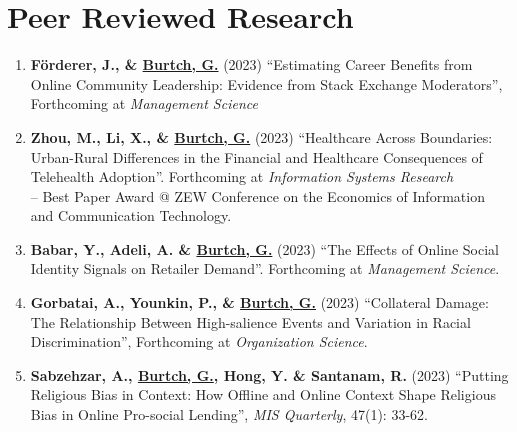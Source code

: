 \documentclass[10.5pt,letterpaper,sans]{moderncv}        %
\renewcommand*{\bibliographyitemlabel}{[\arabic{enumiv}]} %
\renewcommand*{\bibliographyitemlabel}{\arabic{enumiv}.} %
\begin{document}

\vspace{8 pt}

\section{Peer Reviewed Research}

\smallskip

\begin{enumerate}[leftmargin=!,labelindent=5pt,itemindent=-15pt]

\item \textbf{F{\"o}rderer, J., \& \underline{Burtch, G.}} (2023) ``Estimating Career Benefits from Online Community Leadership: Evidence from Stack Exchange Moderators'', Forthcoming at \textit{Management Science}

\item \textbf{Zhou, M., Li, X., \& \underline{Burtch, G.}} (2023) ``Healthcare Across Boundaries: Urban-Rural Differences in the Financial and Healthcare Consequences of Telehealth Adoption''. Forthcoming at \textit{Information Systems Research} \\-- Best Paper Award @ ZEW Conference on the Economics of Information and Communication Technology.

\item \textbf{Babar, Y., Adeli, A. \& \underline{Burtch, G.}} (2023) ``The Effects of Online Social Identity Signals on Retailer Demand''. Forthcoming at \textit{Management Science}.


\item \textbf{Gorbatai, A., Younkin, P., \& \underline{Burtch, G.}} (2023) ``Collateral Damage: The Relationship Between High-salience Events and Variation in Racial Discrimination'', Forthcoming at \textit{Organization Science}.

\item \textbf{Sabzehzar, A., \underline{Burtch, G.}, Hong, Y. \& Santanam, R.} (2023) ``Putting Religious Bias in Context: How Offline and Online Context Shape Religious Bias in Online Pro-social Lending'', \textit{MIS Quarterly}, 47(1): 33-62.


\end{enumerate}
\end{document}
